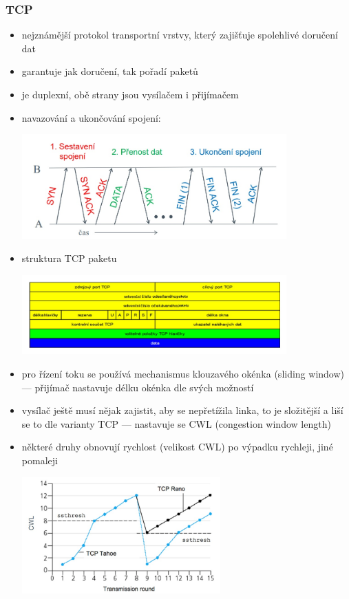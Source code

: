 \subsubsection*{TCP}
\begin{itemize}
	\item nejznámější protokol transportní vrstvy, který zajišťuje spolehlivé doručení dat
	\item garantuje jak doručení, tak pořadí paketů
	\item je duplexní, obě strany jsou vysílačem i přijímačem
	\item navazování a ukončování spojení:	
	
	\includegraphics[width=0.8\textwidth]{img/SP-25_0.jpg}
	
	\item struktura TCP paketu
	
	\includegraphics[width=0.8\textwidth]{img/SP-25_1.jpg}
	
	\item pro řízení toku se používá mechanismus klouzavého okénka (sliding window) --- přijímač nastavuje délku okénka dle svých možností
	
	\item vysílač ještě musí nějak zajistit, aby se nepřetížila linka, to je složitější a liší se to dle varianty TCP --- nastavuje se CWL (congestion window length)
	\item některé druhy obnovují rychlost (velikost CWL) po výpadku rychleji, jiné pomaleji
	
	\includegraphics[width=0.6\textwidth]{img/SP-25_2.jpg}
	
\end{itemize}

